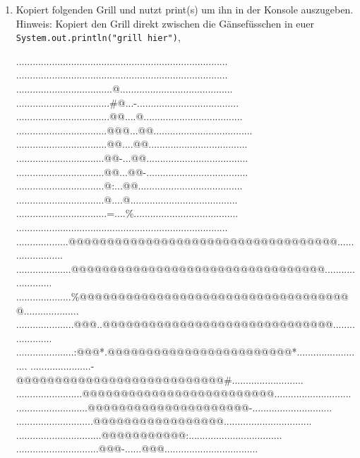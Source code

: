 \documentclass{../../sheet}
\begin{document}
\begin{enumerate}
    \item Kopiert folgenden Grill und nutzt print(s) um ihn in der Konsole auszugeben.\\
    Hinweis: Kopiert den Grill direkt zwischen die Gänsefüsschen in euer \texttt{System.out.println("grill hier")},  
          \begin{ausgabe}
              .............................................................................
              .............................................................................
              ...................................@.........................................
              ..................................\#@...-.....................................
              ..................................@@....@....................................
              .................................@@@...@@....................................
              .................................@@....@@....................................
              ................................@@-...@@.....................................
              ................................@@...@@-.....................................
              ................................@:...@@......................................
              ................................@....@.......................................
              .................................=....\%......................................
              .............................................................................
              ...................@@@@@@@@@@@@@@@@@@@@@@@@@@@@@@@@@@@.......................
              ....................@@@@@@@@@@@@@@@@@@@@@@@@@@@@@@@@@........................
              ....................\%@@@@@@@@@@@@@@@@@@@@@@@@@@@@@@@@@@@@....................
              .....................@@@..@@@@@@@@@@@@@@@@@@@@@@@@@@@@@@.....................
              .....................:@@@*.@@@@@@@@@@@@@@@@@@@@@@@@*.........................
              ......................-@@@@@@@@@@@@@@@@@@@@@@@@@@@\#..........................
              ........................@@@@@@@@@@@@@@@@@@@@@@@@@............................
              ..........................@@@@@@@@@@@@@@@@@@@@@-.............................
              ............................@@@@@@@@@@@@@@@@@................................
              ...............................@@@@@@@@@@@:..................................
              ..............................@@@-......@@@..................................

\end{ausgabe}
\end{enumerate}
\end{document}
